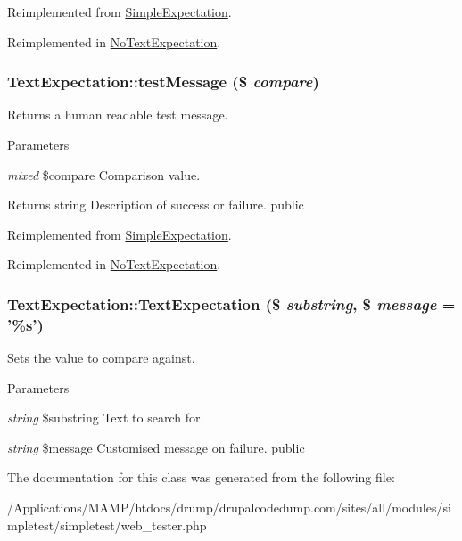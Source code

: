 Reimplemented from \hyperlink{class_simple_expectation_aa2b98f827e7487ebe12cedb9ad39d061}{SimpleExpectation}.

Reimplemented in \hyperlink{class_no_text_expectation_aea5e85eb1d03d5f48cb463f09d756a9e}{NoTextExpectation}.\hypertarget{class_text_expectation_ab76e87201a16eb23fbb1fbafc24b51cf}{
\subsubsection[{testMessage}]{\setlength{\rightskip}{0pt plus 5cm}TextExpectation::testMessage (\$ {\em compare})}}
\label{class_text_expectation_ab76e87201a16eb23fbb1fbafc24b51cf}
Returns a human readable test message. 
\begin{DoxyParams}{Parameters}
\item[{\em mixed}]\$compare Comparison value. \end{DoxyParams}
\begin{DoxyReturn}{Returns}
string Description of success or failure.  public 
\end{DoxyReturn}


Reimplemented from \hyperlink{class_simple_expectation_a15b69edf659c76f6543aa98d8d85b025}{SimpleExpectation}.

Reimplemented in \hyperlink{class_no_text_expectation_ab233e35e0f5912da893c34c8eda835fc}{NoTextExpectation}.\hypertarget{class_text_expectation_a2305ea4ee24e0c0672af8605f25a524b}{
\subsubsection[{TextExpectation}]{\setlength{\rightskip}{0pt plus 5cm}TextExpectation::TextExpectation (\$ {\em substring}, \/  \$ {\em message} = {\ttfamily '\%s'})}}
\label{class_text_expectation_a2305ea4ee24e0c0672af8605f25a524b}
Sets the value to compare against. 
\begin{DoxyParams}{Parameters}
\item[{\em string}]\$substring Text to search for. \item[{\em string}]\$message Customised message on failure.  public \end{DoxyParams}


The documentation for this class was generated from the following file:\begin{DoxyCompactItemize}
\item 
/Applications/MAMP/htdocs/drump/drupalcodedump.com/sites/all/modules/simpletest/simpletest/web\_\-tester.php\end{DoxyCompactItemize}
